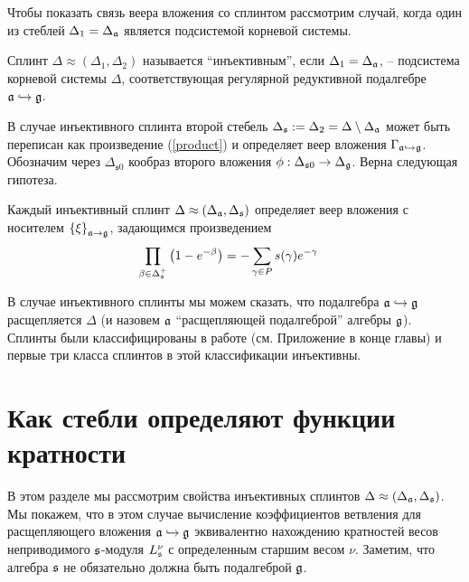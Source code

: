 Чтобы показать связь веера вложения со сплинтом рассмотрим случай, когда один из стеблей $\Delta _{1}=\Delta _{\mathfrak{a}}$  является подсистемой корневой системы. 

Сплинт $\Delta \approx (\Delta _{1},\Delta _{2})$ называется ``инъективным'', если $\Delta _{1}=\Delta _{\mathfrak{a}}$, -- подсистема корневой системы $\Delta $, соответствующая регулярной редуктивной подалгебре $\mathfrak{a}\hookrightarrow \mathfrak{g}$. 

В случае инъективного сплинта второй стебель $\Delta _{\mathfrak{s}}:=\Delta_{2}=\Delta \setminus \Delta _{\mathfrak{a}}$ может быть переписан как произведение (\ref{product}) и определяет веер вложения  $\Gamma _{\mathfrak{a}\hookrightarrow \mathfrak{g}}$. Обозначим через $\Delta_{\mathfrak{s}0}$ кообраз второго вложения $\phi:\Delta_{\mathfrak{s}0}\to \Delta_{\mathfrak{g}}$. Верна следующая гипотеза.

\begin{Cnj}
Каждый инъективный сплинт $\Delta \approx (\Delta _{\mathfrak{a}},\Delta _{\mathfrak{s}})$ определяет веер вложения с носителем $\left\{ \xi \right\} _{\mathfrak{a}\rightarrow \mathfrak{g}}$, задающимся произведением
\begin{equation}
\prod_{\beta \in \Delta _{\mathfrak{s}}^{+}}\left( 1-e^{-\beta }\right)
=-\sum_{\gamma \in P}s(\gamma )e^{-\gamma }\quad   \label{splint product}
\end{equation}
\end{Cnj}

В случае инъективного сплинты мы можем сказать, что подалгебра $\mathfrak{a}\hookrightarrow \mathfrak{g}$ расщепляется $\Delta$ (и назовем $\mathfrak{a}$ ``расщепляющей подалгеброй'' алгебры $\mathfrak{g}$).  Сплинты были классифицированы в работе \cite{richter2008splints}  (см. Приложение в конце главы) и первые три класса сплинтов в этой классификации инъективны. 

\section{Как стебли определяют функции кратности}

\label{sec:stems and multiplicity functions}

В этом разделе мы рассмотрим свойства инъективных сплинтов $\Delta \approx (\Delta _{\mathfrak{a}},\Delta _{\mathfrak{s}})$. Мы покажем, что в этом случае вычисление коэффициентов ветвления для расщепляющего вложения $\mathfrak{a}\hookrightarrow\mathfrak{g}$ эквивалентно нахождению кратностей весов неприводимого $\mathfrak{s}$-модуля $L_{\mathfrak{s}}^{\nu }$ с определенным старшим весом $\nu $. Заметим, что алгебра $\mathfrak{s}$ не обязательно должна быть подалгеброй $\mathfrak{g}$.

